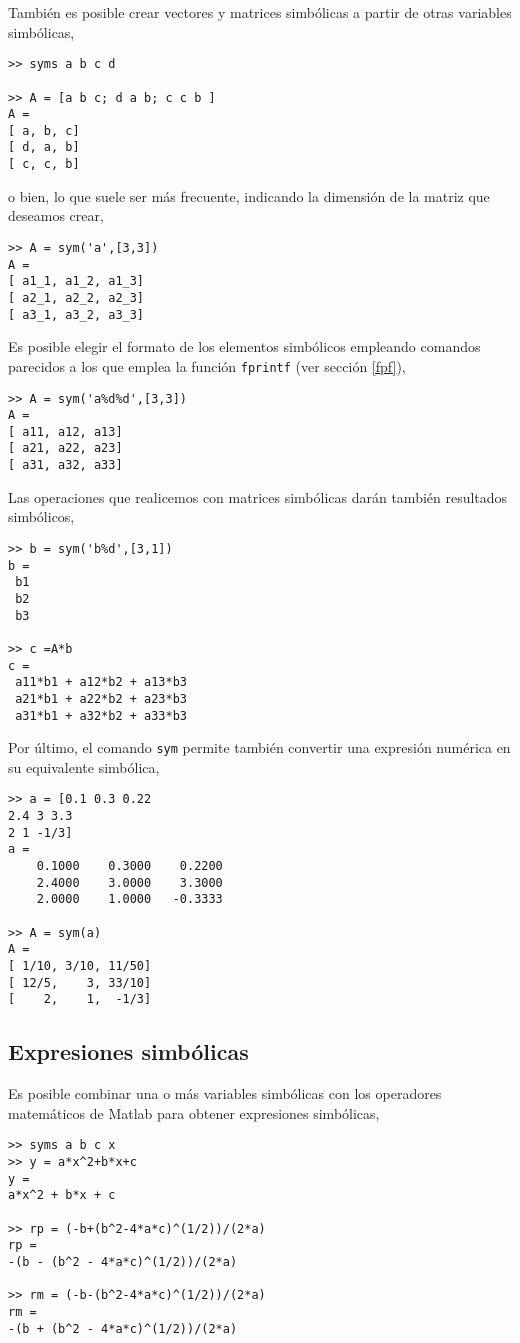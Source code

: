 También es posible crear vectores y matrices simbólicas a partir de otras variables simbólicas,
\begin{verbatim}
>> syms a b c d
 
>> A = [a b c; d a b; c c b ] 
A = 
[ a, b, c]
[ d, a, b]
[ c, c, b]
\end{verbatim}  

o bien, lo que suele ser más frecuente, indicando la dimensión de la matriz que deseamos crear,
\begin{verbatim}
>> A = sym('a',[3,3]) 
A = 
[ a1_1, a1_2, a1_3]
[ a2_1, a2_2, a2_3]
[ a3_1, a3_2, a3_3]
\end{verbatim}
Es posible elegir el formato de los elementos simbólicos empleando comandos parecidos a los que emplea la función \texttt{fprintf} (ver sección \ref{fpf}),
\begin{verbatim}
>> A = sym('a%d%d',[3,3]) 
A = 
[ a11, a12, a13]
[ a21, a22, a23]
[ a31, a32, a33]
\end{verbatim}
Las operaciones que realicemos con matrices simbólicas darán también resultados simbólicos,

\begin{verbatim}
>> b = sym('b%d',[3,1]) 
b = 
 b1
 b2
 b3
 
>> c =A*b 
c = 
 a11*b1 + a12*b2 + a13*b3
 a21*b1 + a22*b2 + a23*b3
 a31*b1 + a32*b2 + a33*b3
\end{verbatim}

Por último, el comando \texttt{sym} permite también convertir una expresión numérica en su equivalente simbólica,
\begin{verbatim}
>> a = [0.1 0.3 0.22
2.4 3 3.3
2 1 -1/3]
a =
    0.1000    0.3000    0.2200
    2.4000    3.0000    3.3000
    2.0000    1.0000   -0.3333

>> A = sym(a) 
A = 
[ 1/10, 3/10, 11/50]
[ 12/5,    3, 33/10]
[    2,    1,  -1/3]
\end{verbatim}



\subsection{Expresiones simbólicas}
Es posible combinar una o más variables simbólicas con los operadores matemáticos de Matlab para obtener expresiones simbólicas,

\begin{verbatim}
>> syms a b c x
>> y = a*x^2+b*x+c 
y = 
a*x^2 + b*x + c
 
>> rp = (-b+(b^2-4*a*c)^(1/2))/(2*a) 
rp = 
-(b - (b^2 - 4*a*c)^(1/2))/(2*a)
 
>> rm = (-b-(b^2-4*a*c)^(1/2))/(2*a) 
rm = 
-(b + (b^2 - 4*a*c)^(1/2))/(2*a)
\end{verbatim}

